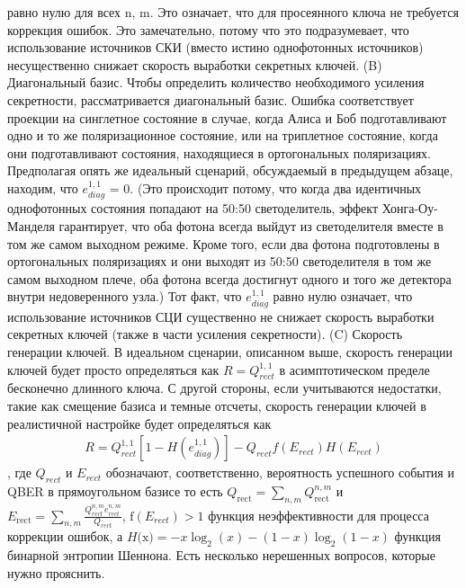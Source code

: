 равно нулю для всех n, m. Это означает, что для просеянного ключа не требуется коррекция ошибок. Это замечательно, потому что это подразумевает, что использование источников СКИ (вместо истино однофотонных источников) несущественно снижает скорость выработки секретных ключей.
\newline (B) Диагональный базис. Чтобы определить количество необходимого усиления секретности, рассматривается диагональный базис. Ошибка соответствует проекции на синглетное состояние в случае, когда Алиса и Боб подготавливают одно и то же поляризационное состояние, или на триплетное состояние, когда они подготавливают состояния, находящиеся в  ортогональных поляризациях. Предполагая опять же идеальный сценарий, обсуждаемый в предыдущем абзаце, находим, что $e_{diag}^{1,1}$ = 0. (Это происходит потому, что когда два идентичных однофотонных состояния попадают на 50:50 светоделитель, эффект Хонга-Оу-Манделя \cite{hong1987} гарантирует, что оба фотона всегда выйдут из светоделителя вместе в том же самом выходном режиме. Кроме того, если два фотона подготовлены в ортогональных поляризациях и они выходят из 50:50 светоделителя в том же самом выходном плече, оба фотона всегда достигнут одного и того же детектора внутри недоверенного узла.) Тот факт, что $e_{diag}^{1,1}$ равно нулю означает, что использование источников СЦИ существенно не снижает скорость выработки секретных ключей (также в части усиления секретности).
\newline (C) Скорость генерации ключей. В идеальном сценарии, описанном выше, скорость генерации ключей будет просто определяться как $R = Q_{rect}^{1,1}$ в асимптотическом пределе бесконечно длинного ключа. С другой стороны, если учитываются недостатки, такие как смещение базиса и темные отсчеты, скорость генерации ключей в реалистичной настройке будет определяться как
\begin{align}
    R = Q_{rect}^{1,1}[1-H(e_{diag}^{1,1})] - Q_{rect}f(E_{rect})H(E_{rect})
    \label{eq:MDI key rate}
\end{align},
где $Q_{rect}$ и $E_{rect}$ обозначают, соответственно, вероятность успешного события и QBER в прямоугольном базисе то есть $  Q_{\text{rect}} = \sum_{n,m} Q_{\text{rect}}^{n,m}  $ и $E_{\text{rect}} =\sum_{n,m} \frac{Q_{rect}^{n,m}e_{rect}^{n,m}}{Q_{rect}}$, $\text{f}(E_{rect}) > 1$ функция неэффективности для процесса коррекции ошибок, а $H\text{(x)} = - x\log_2(x) - (1 - x)\log_2(1-x) $  функция бинарной энтропии Шеннона. Есть несколько нерешенных вопросов, которые нужно прояснить.
